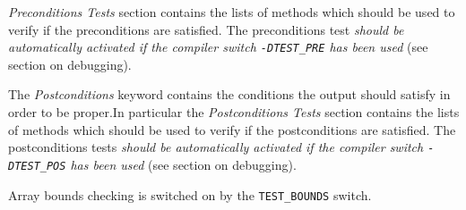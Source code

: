 \begin{description}
  \emph{Preconditions Tests} section contains the lists of methods
  which should be used to verify if the preconditions are satisfied.
  The preconditions test \emph{should be automatically activated if
    the compiler switch \texttt{-DTEST\_PRE} has been used} (see
  section on debugging).
\item The \emph{Postconditions} keyword contains the conditions the
  output should satisfy in order to be proper.In particular the
  \emph{Postconditions Tests} section contains the lists of methods
  which should be used to verify if the postconditions are satisfied.
  The postconditions tests \emph{should be automatically activated if
    the compiler switch \texttt{-DTEST\_POS} has been used} (see
  section on debugging).
\item Array bounds checking is switched on by the \texttt{TEST\_BOUNDS} switch.
\end{description}
